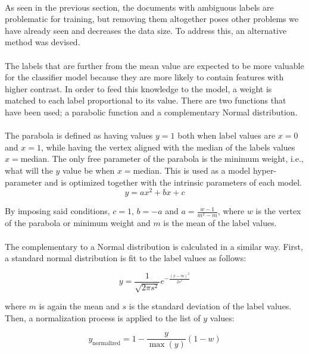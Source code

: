 \documentclass[12pt,a4paper]{report}
\begin{document}
\paragraph{} As seen in the previous section, the documents with ambiguous labels are problematic for training, but removing them altogether poses other problems we have already seen and decreases the data size. To address this, an alternative method was devised.

\paragraph{} The labels that are further from the mean value are expected to be more valuable for the classifier model because they are more likely to contain features with higher contrast. In order to feed this knowledge to the model, a weight is matched to each label proportional to its value. There are two functions that have been used; a parabolic function and a complementary Normal distribution.

\paragraph{} The parabola is defined as having values $y=1$ both when label values are $x=0$ and $x=1$, while having the vertex aligned with the median of the labels values $x=$median. The only free parameter of the parabola is the minimum weight, i.e., what will the $y$ value be when $x=$median. This is used as a model hyper-parameter and is optimized together with the intrinsic parameters of each model.
$$y=ax^2+bx+c$$

By imposing said conditions, $c=1$, $b=-a$ and $a=\frac{w-1}{m^2-m}$, where $w$ is the vertex of the parabola or minimum weight and $m$ is the mean of the label values.

\paragraph{} The complementary to a Normal distribution is calculated in a similar way. First, a standard normal distribution is fit to the label values as follows:

$$y=\frac{1}{\sqrt{2\pi s^2}}e^{-\frac{(x-m)^2}{2s^2}}$$

where $m$ is again the mean and $s$ is the standard deviation of the label values. Then, a normalization process is applied to the list of $y$ values:

$$y_\text{normalized} = 1-\frac{y}{\max(y)}(1-w) $$
\end{document}
